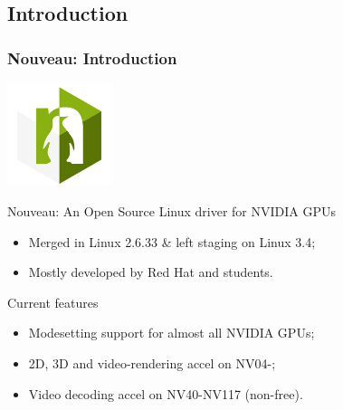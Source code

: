 \documentclass[11pt,english,compress]{beamer}
\begin{document}
\subsection{Introduction}
\begin{frame}
	\frametitle{Nouveau: Introduction}

	\vspace{-0.3cm}
	\begin{center}
		\includegraphics[height=3cm]{imgs/nouveau_logo.jpg}
	\end{center}
	\vspace{-0.3cm}

	\begin{block}{Nouveau: An Open Source Linux driver for NVIDIA GPUs}
		\begin{itemize}
			\item Merged in Linux 2.6.33 \& left staging on Linux 3.4;
			\item Mostly developed by Red Hat and students.
		\end{itemize}
	\end{block}

	\begin{block}{Current features}
		\begin{itemize}
			\item Modesetting support for almost all NVIDIA GPUs;
			\item 2D, 3D and video-rendering accel on NV04-;
			\item Video decoding accel on NV40-NV117 (non-free).
		\end{itemize}
	\end{block}
\end{frame}
\end{document}
